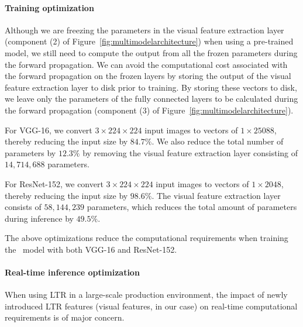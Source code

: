 \paragraph{Training optimization} 
Although we are freezing the parameters in the visual feature extraction layer (component (2) of Figure~\ref{fig:multimodelarchitecture}) when using a pre-trained model, we still need to compute the output from all the frozen parameters during the forward propagation.
We can avoid the computational cost associated with the forward propagation on the frozen layers by storing the output of the visual feature extraction layer to disk prior to training.
By storing these vectors to disk, we leave only the parameters of the fully connected layers to be calculated during the forward propagation (component (3) of Figure~\ref{fig:multimodelarchitecture}).

For VGG-16, we convert $3\times224\times224$ input images to vectors of $1\times25088$, thereby reducing the input size by $84.7\%$.
We also reduce the total number of parameters by $12.3\%$  by removing the visual feature extraction layer consisting of $14,714,688$ parameters.

For ResNet-152, we convert $3\times224\times224$ input images to vectors of $1\times2048$, thereby reducing the input size by $98.6\%$.
The visual feature extraction layer consists of $58,144,239$ parameters, which reduces the total amount of parameters during inference by $49.5\%$.

The above optimizations reduce the computational requirements when training the \modelname~model with both VGG-16 and ResNet-152.

\paragraph{Real-time inference optimization}
When using \ac{LTR} in a large-scale production environment, the impact of newly introduced \ac{LTR} features (visual features, in our case) on real-time computational requirements is of major concern.

